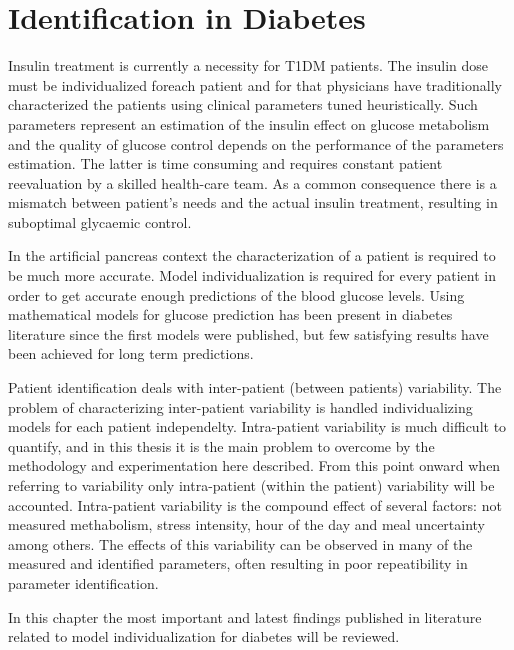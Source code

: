 \chapter{Identification in Diabetes}
\label{sec:IdentificationInDiabetes}


Insulin treatment is currently a necessity for T1DM patients. The insulin dose must be individualized foreach patient and for that physicians have traditionally characterized the patients using clinical parameters tuned heuristically. Such parameters represent an estimation of the insulin effect on glucose metabolism and the quality of glucose control depends on the performance of the parameters estimation. The latter is time consuming and requires constant patient reevaluation by a skilled health-care team. As a common consequence there is a mismatch between patient's needs and the actual insulin treatment, resulting in suboptimal glycaemic control.

In the artificial pancreas context the characterization of a patient is required to be much more accurate. Model individualization is required for every patient in order to get accurate enough predictions of the blood glucose levels. Using mathematical models for glucose prediction has been present in diabetes literature since the first models were published, but few satisfying results have been achieved for long term predictions. 

Patient identification deals with inter-patient (between patients) variability. The problem of characterizing inter-patient variability is handled individualizing models for each patient independelty. Intra-patient variability is much difficult to quantify, and in this thesis it is the main problem to overcome by the methodology and experimentation here described. From this point onward when referring to variability only intra-patient (within the patient) variability will be accounted. Intra-patient variability is the compound effect of several factors: not measured methabolism, stress intensity, hour of the day and meal uncertainty among others. The effects of this variability can be observed in many of the measured and identified parameters, often resulting in poor repeatibility in parameter identification.

In this chapter the most important and latest findings published in literature related to model individualization for diabetes will be reviewed.

